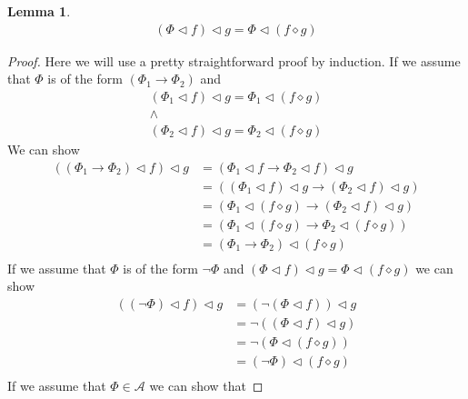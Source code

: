 \documentclass{article}
\newtheorem{lem}{Lemma}
\begin{document}
\begin{lem}
\begin{align*}
(\Phi \lhd f) \lhd g = \Phi \lhd (f \diamond g)
\end{align*}
\end{lem}
\begin{proof}
Here we will use a pretty straightforward proof by induction.
If we assume that $\Phi$ is of the form $(\Phi_1 \rightarrow \Phi_2)$ and
\begin{gather*}
(\Phi_1 \lhd f) \lhd g = \Phi_1 \lhd (f \diamond g) \\
\land \\
(\Phi_2 \lhd f) \lhd g = \Phi_2 \lhd (f \diamond g)
\end{gather*}
We can show
\begin{align*}
((\Phi_1 \rightarrow \Phi_2) \lhd f) \lhd g &= (\Phi_1 \lhd f \rightarrow \Phi_2 \lhd f) \lhd g                     \tag{Definition of Assignment}\\
                                            &= ((\Phi_1 \lhd f) \lhd g \rightarrow (\Phi_2 \lhd f) \lhd g)          \tag{Definition of Assignment}\\
                                            &= (\Phi_1 \lhd (f \diamond g) \rightarrow (\Phi_2 \lhd f) \lhd g)      \tag{Inductive Hypothesis I}\\
                                            &= (\Phi_1 \lhd (f \diamond g) \rightarrow \Phi_2 \lhd (f \diamond g))  \tag{Inductive Hypothesis II}\\
                                            &= (\Phi_1 \rightarrow \Phi_2) \lhd (f \diamond g)                      \tag{Definition of Assignment}\\
\end{align*}
If we assume that $\Phi$ is of the form $\neg\Phi$ and $(\Phi \lhd f) \lhd g = \Phi \lhd (f \diamond g)$ we can show
\begin{align*}
((\neg \Phi) \lhd f) \lhd g &= (\neg (\Phi \lhd f)) \lhd g     \tag{Definition of Assignment} \\
                            &= \neg ((\Phi \lhd f) \lhd g)     \tag{Definition of Assignment} \\
                            &= \neg (\Phi \lhd (f \diamond g)) \tag{Inductive Hypothesis}     \\
                            &= (\neg \Phi) \lhd (f \diamond g) \tag{Definition of Assignment} \\
\end{align*}
If we assume that $\Phi \in \mathcal{A}$ we can show that

\end{proof}
\end{document}
